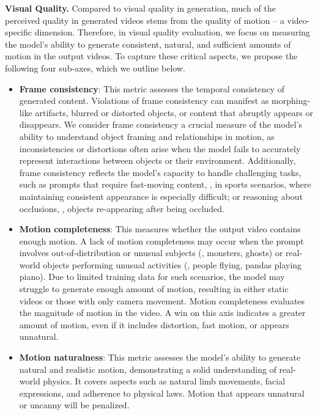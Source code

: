 \noindent \textbf{Visual Quality.}
Compared to visual quality in \textToI generation, much of the perceived quality in generated videos stems from the quality of motion -- a video-specific dimension.
Therefore, in \textToV visual quality evaluation, we focus on measuring the model's ability to generate consistent, natural, and sufficient amounts of motion in the output videos.
To capture these critical aspects, we propose the following four sub-axes, which we outline below.

\begin{itemize}
    \item \textbf{Frame consistency}:
    This metric assesses the temporal consistency of generated content. Violations of frame consistency can manifest as morphing-like artifacts, blurred or distorted objects, or content that abruptly appears or disappears.
    We consider frame consistency a crucial measure of the model's ability to understand object framing and relationships in motion, as inconsistencies or distortions often arise when the model fails to accurately represent interactions between objects or their environment.
    Additionally, frame consistency reflects the model's capacity to handle challenging tasks, such as prompts that require fast-moving content, \eg, in sports scenarios, where maintaining consistent appearance is especially difficult; or reasoning about occlusions, \eg, objects re-appearing after being occluded.

    \item \textbf{Motion completeness}:
    This measures whether the output video contains enough motion. A lack of motion completeness may occur when the prompt involves out-of-distribution or unusual subjects (\eg, monsters, ghosts) or real-world objects performing unusual activities (\eg, people flying, pandas playing piano).
    Due to limited training data for such scenarios, the model may struggle to generate enough amount of motion, resulting in either static videos or those with only camera movement.
    Motion completeness evaluates the magnitude of motion in the video.
    A win on this axis indicates a greater amount of motion, even if it includes distortion, fast motion, or appears unnatural.

    \item \textbf{Motion naturalness}:
    This metric assesses the model's ability to generate natural and realistic motion, demonstrating a solid understanding of real-world physics.
    It covers aspects such as natural limb movements, facial expressions, and adherence to physical laws. Motion that appears unnatural or uncanny will be penalized.


\end{itemize}
